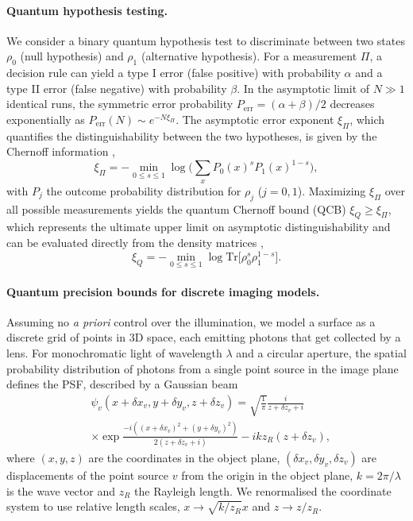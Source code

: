 \documentclass[reprint,amsmath,amssymb,aps,prl,floatfix,groupedaddress,superscriptaddress]{revtex4-2}
\begin{document}
\paragraph{Quantum hypothesis testing.\label{sec:hypothesistesting}}
We consider a binary quantum hypothesis test to discriminate between two states $\rho_0$ (null hypothesis) and $\rho_1$ (alternative hypothesis). For a  measurement $\Pi$, a decision rule can yield a type I error (false positive) with probability $\alpha$ and a type II error (false negative) with probability $\beta$. In the asymptotic limit of $N \gg 1$ identical runs, the symmetric error probability  $P_{\textrm{err}} = (\alpha + \beta)/2$ decreases exponentially as $P_{\textrm{err}}(N) \sim e^{-N \xi_{\Pi}}$. The asymptotic error exponent $\xi_{\Pi}$, which quantifies the distinguishability between the two hypotheses, is given by the Chernoff information \cite{cover1999elements},
\begin{equation} \label{eq:CCB}
    \xi_{\Pi} = - \min_{0 \leq s \leq 1} \log \Big( \sum_x P_0(x)^s P_1(x)^{1-s} \Big),
\end{equation}
with $P_j$ the outcome probability distribution for $\rho_j$ ($j=0,1$). Maximizing $\xi_{\Pi}$ over all possible measurements yields the quantum Chernoff bound (QCB) $\xi_Q \geq \xi_\Pi$, which represents the ultimate upper limit on asymptotic distinguishability and can be evaluated directly from the density matrices \cite{audenaert2007discriminating},
\begin{equation} \label{eq:QCB}
\xi_Q = - \min_{0 \leq s \leq 1} \log \text{Tr} \big[ \rho_0^s \rho_1^{1-s} \big].
\end{equation}


\paragraph{\bfseries Quantum precision bounds for discrete imaging models.\label{sec:CR-bounds} }
Assuming no \textit{a priori} control  over the illumination, we model a surface as a discrete grid of points in 3D space, each emitting photons that get collected by a lens. For monochromatic light of wavelength $\lambda$ and a circular aperture, the spatial probability distribution of photons from a single point source in the image plane defines the PSF, described by a Gaussian beam
\begin{equation}
\begin{aligned}
\label{def:psf}
\!\!    &\psi_v (x+\delta x_v,y+\delta y_v,z+\delta z_v) = \sqrt{\frac{1}{\pi}} \frac{i}{z+\delta z_v + i} \\
\!\!    &\times \exp{\frac{-i((x+\delta x_v)^2 + (y+ \delta y_v)^2)}{2(z+\delta z_v + i)} - ikz_R(z+\delta z_v)},
\end{aligned}
\end{equation}
where $(x,y,z)$ are the coordinates in the object plane, $(\delta x_v,\delta y_v,\delta z_v)$ are displacements of the point source $v$ from the origin in the object plane, $k= 2\pi / \lambda$ is the wave vector and $z_R$ the Rayleigh length. We renormalised the coordinate system to use relative length scales, $x \rightarrow \sqrt{k/z_R}x$ and $ z \rightarrow z/z_R$.
\end{document}
